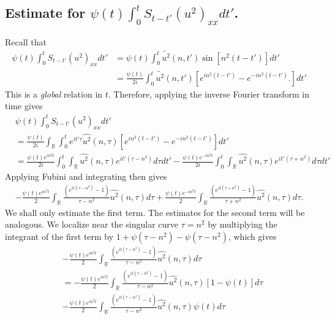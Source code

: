 \documentclass[12pt,reqno]{amsart}
\numberwithin{equation}{section}  %
\numberwithin{figure}{section}
\newcommand{\rr}{\mathbb{R}}
\newcommand{\wh}{\widehat}
\begin{document}
\subsection{Estimate for $\psi(t) \int_{0}^{t} S_{t-t'} (u^{2})_{xx} dt'$.}
Recall that
%
%
\begin{equation*}
  \begin{split}
    \psi(t) \int_{0}^{t} S_{t-t'} (u^{2})_{xx} dt'
    & = \psi(t) \int_{0}^{t}\widetilde{u^{2}}(n, t') \sin[n^{2}(t -t')] dt'
    \\
    & = \frac{\psi(t)}{2i} \int_{0}^{t}\widetilde{u^{2}}(n, t') \left[
    e^{in^{2}(t-t')} - e^{-in^{2}(t-t')}.
    \right] dt'
  \end{split}
\end{equation*}
%
%
This is a \emph{global} relation in $t$. Therefore, applying the inverse Fourier
transform in time gives
\begin{equation*}
  \begin{split}
    & \psi(t) \int_{0}^{t} S_{t-t'} (u^{2})_{xx} dt'
    \\
    & = \frac{\psi(t)}{2i} \int_{\rr} \int_{0}^{t} e^{it'
    \tau}\wh{u^{2}}(n, \tau) \left[
    e^{in^{2}(t-t')} - e^{-in^{2}(t-t')}
    \right] dt'
    \\
    & = \frac{\psi(t)e^{in^{2}t}}{2i} \int_{0}^{t} \int_{\rr} \wh{u^{2}}(n,
    \tau)e^{it'(\tau - n^{2})}d\tau dt' 
    - \frac{\psi(t)e^{-in^{2}t}}{2i} \int_{0}^{t} \int_{\rr} \wh{u^{2}}(n,
    \tau)e^{it'(\tau + n^{2})}d\tau dt' 
  \end{split}
\end{equation*}
%
Applying Fubini and integrating then gives
%
%
%
%
\begin{equation*}
  \begin{split}
    -\frac{\psi(t)e^{in^{2}t}}{2} \int_{\rr}  \frac{\left( e^{it(\tau -
    n^{2})}-1 \right)}{\tau - n^{2}} \wh{u^{2}}(n, \tau)d \tau +
    \frac{\psi(t)e^{-in^{2}t}}{2} \int_{\rr}  \frac{\left( e^{it(\tau +
    n^{2})}-1 \right)}{\tau + n^{2}} \wh{u^{2}}(n, \tau)d \tau.
  \end{split}
\end{equation*}
%
%
We shall only estimate the first term. The estimates for the second term will be
analogous. 
We localize near the singular curve $\tau =  n^2$ 
by multiplying the
integrant of the first term  by $1 + \psi(\tau -
n^2) - \psi(\tau -
n^2) $, which gives 
%
%
\begin{equation*}
  \begin{split}
    & -\frac{\psi(t)e^{in^{2}t}}{2} \int_{\rr}  \frac{\left( e^{it(\tau -
    n^{2})}-1 \right)}{\tau - n^{2}} \wh{u^{2}}(n, \tau)d \tau 
    \\
    & = -\frac{\psi(t)e^{in^{2}t}}{2} \int_{\rr}  \frac{\left( e^{it(\tau -
    n^{2})}-1 \right)}{\tau - n^{2}} \wh{u^{2}}(n, \tau)\left[ 1 - \psi(t) \right] d \tau 
    \\
    & -\frac{\psi(t)e^{in^{2}t}}{2} \int_{\rr}  \frac{\left( e^{it(\tau -
    n^{2})}-1 \right)}{\tau - n^{2}} \wh{u^{2}}(n, \tau)\psi(t) d \tau 
  \end{split}
\end{equation*}
%
%
\end{document}
